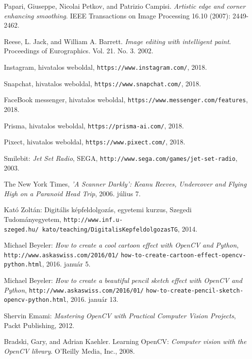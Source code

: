 
\begin{thebibliography}{x}

Papari, Giuseppe, Nicolai Petkov, and Patrizio Campisi. \emph{Artistic edge and corner enhancing smoothing}. IEEE Transactions on Image Processing 16.10 (2007): 2449-2462.

Reese, L. Jack, and William A. Barrett. \emph{Image editing with intelligent paint}. Proceedings of Eurographics. Vol. 21. No. 3. 2002.

Instagram, hivatalos weboldal, \texttt{https://www.instagram.com/}, 2018.

Snapchat, hivatalos weboldal, \texttt{https://www.snapchat.com/}, 2018.

FaceBook messenger, hivatalos weboldal, \texttt{https://www.messenger.com/features}, 2018.

Prisma, hivatalos weboldal, \texttt{https://prisma-ai.com/}, 2018.

Pixect, hivatalos weboldal, \texttt{https://www.pixect.com/}, 2018.

Smilebit: \emph{Jet Set Radio}, SEGA, \texttt{http://www.sega.com/games/jet-set-radio}, 2003.

The New York Times, \emph{'A Scanner Darkly': Keanu Reeves, Undercover and Flying High on a Paranoid Head Trip}, 2006. július 7.

Kató Zoltán: Digitális képfeldolgozás, egyetemi kurzus, Szegedi Tudományegyetem, \texttt{http://www.inf.u-szeged.hu/~kato/teaching/DigitalisKepfeldolgozasTG}, 2014.

 Michael Beyeler: \emph{How to create a cool cartoon effect with OpenCV and Python}, \texttt{http://www.askaswiss.com/2016/01/} \texttt{how-to-create-cartoon-effect-opencv-python.html}, 2016. január 5.

 Michael Beyeler: \emph{How to create a beautiful pencil sketch effect with OpenCV and Python}, \texttt{http://www.askaswiss.com/2016/01/} \texttt{how-to-create-pencil-sketch-opencv-python.html}, 2016. január 13.

 Shervin Emami: \emph{Mastering OpenCV with Practical Computer Vision Projects}, Packt Publishing, 2012.

Bradski, Gary, and Adrian Kaehler. Learning OpenCV: \emph{Computer vision with the OpenCV library}. O'Reilly Media, Inc., 2008.


\end{thebibliography}